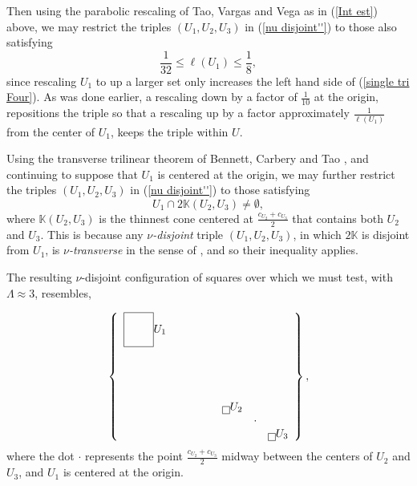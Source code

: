 \documentclass{amsart}%
\theoremstyle{plain}
\numberwithin{equation}{section}
\begin{document}
Then using the parabolic rescaling of Tao, Vargas and Vega \cite{TaVaVe} as in
(\ref{Int est}) above, we may restrict the triples $\left(  U_{1},U_{2}%
,U_{3}\right)  $ in (\ref{nu disjoint''}) to those also satisfying%
\[
\frac{1}{32}\leq\ell\left(  U_{1}\right)  \leq\frac{1}{8},
\]
since rescaling $U_{1}$ to up a larger set only increases the left hand side
of (\ref{single tri Four}). As was done earlier, a rescaling down by a factor
of $\frac{1}{10}$ at the origin, repositions the triple so that a rescaling up
by a factor approximately $\frac{1}{\ell\left(  U_{1}\right)  }$ from the
center of $U_{1}$, keeps the triple within $U$.

Using the transverse trilinear theorem of Bennett, Carbery and Tao
\cite[Theorem 1.15]{BeCaTa}, and continuing to suppose that $U_{1}$ is
centered at the origin, we may further restrict the triples $\left(
U_{1},U_{2},U_{3}\right)  $ in (\ref{nu disjoint''}) to those satisfying%
\[
U_{1}\cap2\mathbb{K}\left(  U_{2},U_{3}\right)  \mathbb{\neq\emptyset},
\]
where $\mathbb{K}\left(  U_{2},U_{3}\right)  $ is the thinnest cone centered
at $\frac{c_{U_{2}}+c_{U_{3}}}{2}$ that contains both $U_{2}$ and $U_{3}$.
This is because any $\nu$\emph{-disjoint} triple $\left(  U_{1},U_{2}%
,U_{3}\right)  $, in which $2\mathbb{K}$ is disjoint from $U_{1}$, is $\nu
$\emph{-transverse} in the sense of \cite{BeCaTa}, and so their inequality applies.

The resulting $\nu$-disjoint configuration of squares over which we must test,
with $\Lambda\approx3$, resembles,%

\[
\left\{
\begin{array}
[c]{cccccccc}%
\fbox{$%
\begin{array}
[c]{cc}
& \\
&
\end{array}
$}U_{1} &  &  &  &  &  &  & \\
&  &  &  &  &  &  & \\
&  &  &  &  &  &  & \\
&  &  &  &  &  &  & \\
&  &  &  &  &  &  & \\
&  &  &  &  & \fbox{}U_{2} &  & \\
&  &  &  &  &  & \cdot & \\
&  &  &  &  &  &  & \fbox{}U_{3}%
\end{array}
\right\}  ,
\]
where the dot $\cdot$ represents the point $\frac{c_{U_{2}}+c_{U_{3}}}{2}$
midway between the centers of $U_{2}$ and $U_{3}$, and $U_{1}$ is centered at
the origin.
\end{document}
